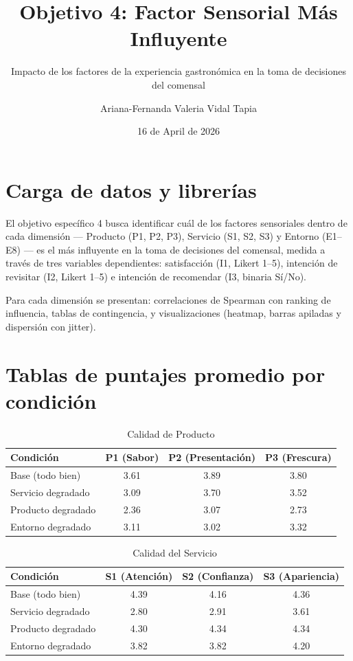 \documentclass[
  spanish,
]{article}
\title{Objetivo 4: Factor Sensorial Más Influyente}
\subtitle{Impacto de los factores de la experiencia gastronómica en la
toma de decisiones del comensal}
\author{Ariana-Fernanda Valeria Vidal Tapia}
\date{16 de April de 2026}
\begin{document}
\maketitle

{
\setcounter{tocdepth}{3}
\tableofcontents
}
\section{Carga de datos y
librerías}\label{carga-de-datos-y-libreruxedas}

El objetivo específico 4 busca identificar cuál de los factores
sensoriales dentro de cada dimensión --- Producto (P1, P2, P3), Servicio
(S1, S2, S3) y Entorno (E1--E8) --- es el más influyente en la toma de
decisiones del comensal, medida a través de tres variables dependientes:
satisfacción (I1, Likert 1--5), intención de revisitar (I2, Likert 1--5)
e intención de recomendar (I3, binaria Sí/No).

Para cada dimensión se presentan: correlaciones de Spearman con ranking
de influencia, tablas de contingencia, y visualizaciones (heatmap,
barras apiladas y dispersión con jitter).

\section{Tablas de puntajes promedio por
condición}\label{tablas-de-puntajes-promedio-por-condiciuxf3n}

\begin{longtable}[t]{lccc}
\caption{\label{tab:tabla-calidad-producto}Calidad de Producto}\\
\toprule
Condición & P1 (Sabor) & P2 (Presentación) & P3 (Frescura)\\
\midrule
Base (todo bien) & 3.61 & 3.89 & 3.80\\
Servicio degradado & 3.09 & 3.70 & 3.52\\
Producto degradado & 2.36 & 3.07 & 2.73\\
Entorno degradado & 3.11 & 3.02 & 3.32\\
\bottomrule
\end{longtable}

\begin{longtable}[t]{lccc}
\caption{\label{tab:tabla-calidad-servicio}Calidad del Servicio}\\
\toprule
Condición & S1 (Atención) & S2 (Confianza) & S3 (Apariencia)\\
\midrule
Base (todo bien) & 4.39 & 4.16 & 4.36\\
Servicio degradado & 2.80 & 2.91 & 3.61\\
Producto degradado & 4.30 & 4.34 & 4.34\\
Entorno degradado & 3.82 & 3.82 & 4.20\\
\bottomrule
\end{longtable}
\end{document}

